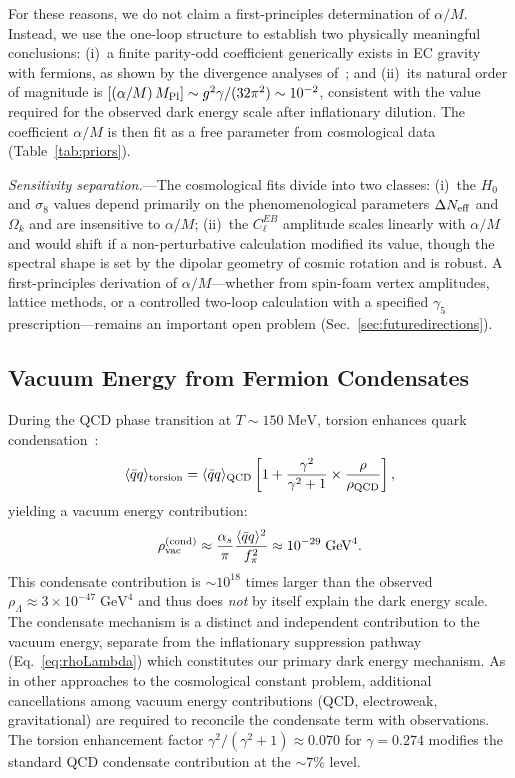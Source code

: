 \documentclass[aps,prd,twocolumn,superscriptaddress,showpacs,preprintnumbers,nofootinbib,longbibliography,floatfix]{revtex4-2}
\newcommand{\MPl}{M_{\rm Pl}}
\newcommand{\Neff}{N_{\rm eff}}
\begin{document}
For these reasons, we do not claim a first-principles determination of $\alpha/M$. Instead, we use the one-loop structure to establish two physically meaningful conclusions: (i)~a finite parity-odd coefficient generically exists in EC gravity with fermions, as shown by the divergence analyses of~\cite{Freidel2005,ShapiroTeixeira2014}; and (ii)~its natural order of magnitude is $[(\alpha/M)\,\MPl]\sim g^2\gamma/(32\pi^2)\sim 10^{-2}$, consistent with the value required for the observed dark energy scale after inflationary dilution. The coefficient $\alpha/M$ is then fit as a free parameter from cosmological data (Table~\ref{tab:priors}).

\textit{Sensitivity separation.}---The cosmological fits divide into two classes: (i)~the $H_0$ and $\sigma_8$ values depend primarily on the phenomenological parameters $\Delta\Neff$ and $\Omega_k$ and are insensitive to $\alpha/M$; (ii)~the $C_\ell^{EB}$ amplitude scales linearly with $\alpha/M$ and would shift if a non-perturbative calculation modified its value, though the spectral shape is set by the dipolar geometry of cosmic rotation and is robust. A first-principles derivation of $\alpha/M$---whether from spin-foam vertex amplitudes, lattice methods, or a controlled two-loop calculation with a specified $\gamma_5$ prescription---remains an important open problem (Sec.~\ref{sec:futuredirections}).


\subsection{Vacuum Energy from Fermion Condensates}\label{sec:condensate}

During the QCD phase transition at $T\sim 150\;\text{MeV}$, torsion enhances quark condensation~\cite{Poplawski2012,Poplawski2011}:
\begin{equation}\label{eq:condensate}
\langle\bar{q}q\rangle_{\rm torsion} = \langle\bar{q}q\rangle_{\rm QCD}\left[1+\frac{\gamma^2}{\gamma^2+1}\times\frac{\rho}{\rho_{\rm QCD}}\right],
\end{equation}
yielding a vacuum energy contribution:
\begin{equation}
\rho_{\rm vac}^{\rm (cond)}\approx \frac{\alpha_s}{\pi}\frac{\langle\bar{q}q\rangle^2}{f_\pi^2} \approx 10^{-29}\;\text{GeV}^4.
\end{equation}
This condensate contribution is $\sim 10^{18}$ times larger than the observed $\rho_\Lambda\approx 3\times 10^{-47}\;\text{GeV}^4$ and thus does \textit{not} by itself explain the dark energy scale. The condensate mechanism is a distinct and independent contribution to the vacuum energy, separate from the inflationary suppression pathway (Eq.~\ref{eq:rhoLambda}) which constitutes our primary dark energy mechanism. As in other approaches to the cosmological constant problem, additional cancellations among vacuum energy contributions (QCD, electroweak, gravitational) are required to reconcile the condensate term with observations. The torsion enhancement factor $\gamma^2/(\gamma^2+1) \approx 0.070$ for $\gamma = 0.274$ modifies the standard QCD condensate contribution at the $\sim 7\%$ level.
\end{document}
